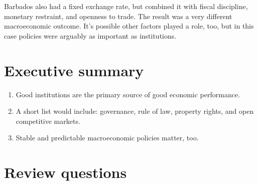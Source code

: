 Barbados also had a fixed exchange rate,
but combined it with fiscal discipline, monetary restraint,
and openness to trade.
The result was a very different macroeconomic outcome.
It's possible other factors played a role, too,
but in this case policies were arguably
as important as institutions.

\begin{comment}
\section{Other factors}

[??]

Democracy, resources, education,....

Summarize evidence.  Mention Barro, Easterly...

Cause or effect?
\end{comment}

\section*{Executive summary}

\begin{enumerate}
\item Good institutions are the primary source of good economic performance.
\item A short list would include:  governance, rule of law,
property rights, and open competitive markets.
\item Stable and predictable macroeconomic policies matter, too.
\end{enumerate}

\section*{Review questions}

